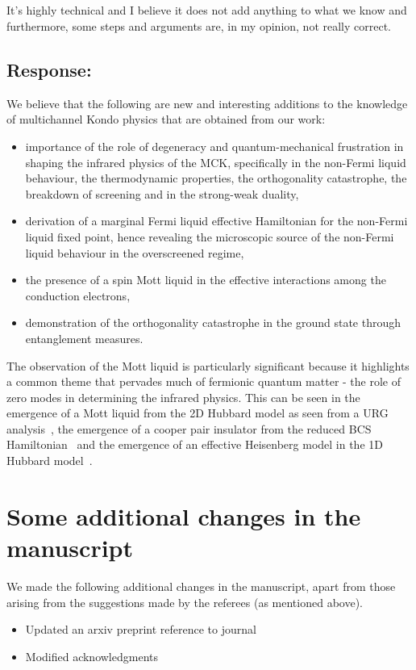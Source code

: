 \documentclass{article}
\newcommand{\response}[1]{{\color{blue}\subsection*{Response:}{#1}}}
\newcommand{\point}[1]{\subsection{}{#1}}
\begin{document}
\point{
It’s highly
technical and I believe it does not add anything to what we know and
furthermore, some steps and arguments are, in my opinion, not really
correct.
}

\response{
We believe that the following are new and interesting additions to the knowledge of multichannel Kondo physics that are obtained from our work:
\begin{itemize}
	\item importance of the role of degeneracy and quantum-mechanical frustration in shaping the infrared physics of the MCK, specifically in the non-Fermi liquid behaviour, the thermodynamic properties, the orthogonality catastrophe, the breakdown of screening and in the strong-weak duality,
	\item derivation of a marginal Fermi liquid effective Hamiltonian for the non-Fermi liquid fixed point, hence revealing the microscopic source of the non-Fermi liquid behaviour in the overscreened regime,
	\item the presence of a spin Mott liquid in the effective interactions among the conduction electrons,
	\item demonstration of the orthogonality catastrophe in the ground state through entanglement measures.
\end{itemize}
The observation of the Mott liquid is particularly significant because it highlights a common theme that pervades much of fermionic quantum matter - the role of zero modes in determining the infrared physics. This can be seen in the emergence of a Mott liquid from the 2D Hubbard model as seen from a URG analysis~\cite{anirbanmott1,anirbanmott2,mukherjeeMERG2022}, the emergence of a cooper pair insulator from the reduced BCS Hamiltonian~\cite{siddharthacpi} and the emergence of an effective Heisenberg model in the 1D Hubbard model~\cite{1dhubjhep}.
}

\section{Some additional changes in the manuscript}
We made the following additional changes in the manuscript, apart from those arising from the suggestions made by the referees (as mentioned above).
\begin{itemize}
	\item Updated an arxiv preprint reference to journal
	\item Modified acknowledgments
\end{itemize}



\end{document}
